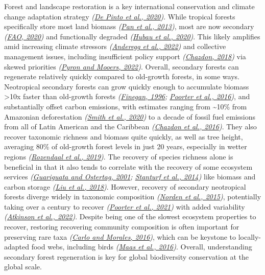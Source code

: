 \documentclass[
  12pt,
]{article}
\begin{document}
Forest and landscape restoration is a key international conservation and climate change adaptation strategy \emph{(\protect\hyperlink{ref-depinto20}{De Pinto et al., 2020})}.
While tropical forests specifically store most land biomass \emph{(\protect\hyperlink{ref-pan13}{Pan et al., 2013})}, most are now secondary \emph{(\protect\hyperlink{ref-fao20}{FAO, 2020})} and functionally degraded \emph{(\protect\hyperlink{ref-hubau20}{Hubau et al., 2020})}.
This likely amplifies amid increasing climate stressors \emph{(\protect\hyperlink{ref-anderegg22}{Anderegg et al., 2022})} and collective management issues, including insufficient policy support \emph{(\protect\hyperlink{ref-chazdon18}{Chazdon, 2018})} via skewed priorities \emph{(\protect\hyperlink{ref-pyron22}{Pyron and Mooers, 2022})}.
Overall, secondary forests can regenerate relatively quickly compared to old-growth forests, in some ways.
Neotropical secondary forests can grow quickly enough to accumulate biomass \textgreater10x faster than old-growth forests \emph{(\protect\hyperlink{ref-finegan96}{Finegan, 1996}; \protect\hyperlink{ref-poorter16}{Poorter et al., 2016})}, and substantially offset carbon emissions, with estimates ranging from \textasciitilde10\% from Amazonian deforestation \emph{(\protect\hyperlink{ref-smith20}{Smith et al., 2020})} to a decade of fossil fuel emissions from all of Latin American and the Caribbean \emph{(\protect\hyperlink{ref-chazdon16}{Chazdon et al., 2016})}.
They also recover taxonomic richness and biomass quite quickly, as well as tree height, averaging 80\% of old-growth forest levels in just 20 years, especially in wetter regions \emph{(\protect\hyperlink{ref-rozendaal19}{Rozendaal et al., 2019})}.
The recovery of species richness alone is beneficial in that it also tends to correlate with the recovery of some ecosystem services \emph{(\protect\hyperlink{ref-guariguata01}{Guariguata and Ostertag, 2001}; \protect\hyperlink{ref-stanturf14}{Stanturf et al., 2014})} like biomass and carbon storage \emph{(\protect\hyperlink{ref-liu18}{Liu et al., 2018})}.
However, recovery of secondary neotropical forests diverge widely in taxonomic composition \emph{(\protect\hyperlink{ref-norden15}{Norden et al., 2015})}, potentially taking over a century to recover \emph{(\protect\hyperlink{ref-poorter21}{Poorter et al., 2021})} with added variability \emph{(\protect\hyperlink{ref-atkinson22}{Atkinson et al., 2022})}.
Despite being one of the slowest ecosystem properties to recover, restoring recovering community composition is often important for preserving rare taxa \emph{(\protect\hyperlink{ref-carlo16}{Carlo and Morales, 2016})}, which can be keystone to locally-adapted food webs, including birds \emph{(\protect\hyperlink{ref-maas16}{Maas et al., 2016})}.
Overall, understanding secondary forest regeneration is key for global biodiversity conservation at the global scale.
\end{document}
